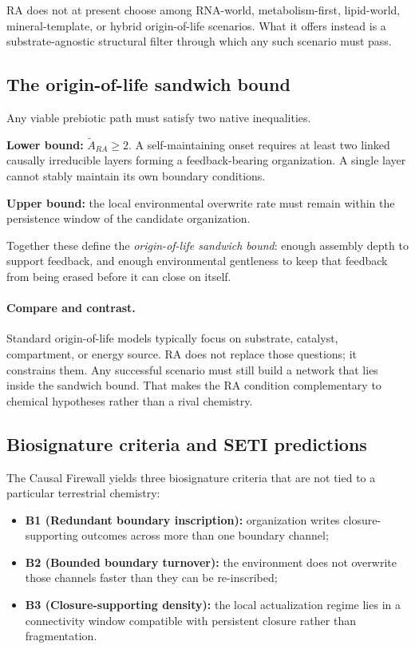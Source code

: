 \documentclass[11pt]{article}
\def\mathrm#1{#1}%
\begin{document}
RA does not at present choose among RNA-world, metabolism-first, lipid-world, mineral-template, or hybrid origin-of-life scenarios. What it offers instead is a substrate-agnostic structural filter through which any such scenario must pass.

\subsection{The origin-of-life sandwich bound}
\label{sec:sandwich}

Any viable prebiotic path must satisfy two native inequalities.

\textbf{Lower bound:} $\tilde{A}_{\mathrm{RA}} \ge 2$. A self-maintaining onset requires at least two linked causally irreducible layers forming a feedback-bearing organization. A single layer cannot stably maintain its own boundary conditions.

\textbf{Upper bound:} the local environmental overwrite rate must remain within the persistence window of the candidate organization.

Together these define the \emph{origin-of-life sandwich bound}: enough assembly depth to support feedback, and enough environmental gentleness to keep that feedback from being erased before it can close on itself.

\paragraph{Compare and contrast.} Standard origin-of-life models typically focus on substrate, catalyst, compartment, or energy source. RA does not replace those questions; it constrains them. Any successful scenario must still build a network that lies inside the sandwich bound. That makes the RA condition complementary to chemical hypotheses rather than a rival chemistry.

\subsection{Biosignature criteria and SETI predictions}
\label{sec:seti}

The Causal Firewall yields three biosignature criteria that are not tied to a particular terrestrial chemistry:
\begin{itemize}[nosep]
    \item \textbf{B1 (Redundant boundary inscription):} organization writes closure-supporting outcomes across more than one boundary channel;
    \item \textbf{B2 (Bounded boundary turnover):} the environment does not overwrite those channels faster than they can be re-inscribed;
    \item \textbf{B3 (Closure-supporting density):} the local actualization regime lies in a connectivity window compatible with persistent closure rather than fragmentation.
\end{itemize}
\end{document}
